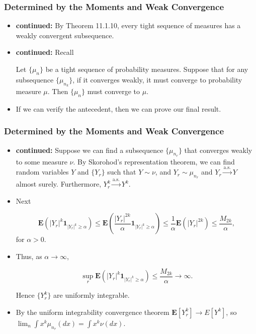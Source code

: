 \documentclass[handout]{beamer}
\newcommand{\BE}{\mathbf{E}}
\newcommand{\BI}{\mathbf{1}}
\begin{document}
\frame
{
  \frametitle{Determined by the Moments and Weak Convergence}

 \begin{itemize}

\item<2-> \textbf{continued:} By Theorem 11.1.10, every tight sequence of measures has a weakly convergent subsequence. 

\item<3-> \textbf{continued:} Recall \begin{Corollary}[11.1.11]
 Let $\{\mu_n\}$ be a tight sequence of probability measures. Suppose that for any subsequence $\{\mu_{n_k}\}$, if it converges weakly, it must converge to probability measure $\mu$. Then $\{\mu_n\}$ must converge to $\mu$.
 \end{Corollary}
 
 \item<4-> If we can verify the antecedent, then we can prove our final result.

\end{itemize}
 }




\frame
{
  \frametitle{Determined by the Moments and Weak Convergence}

 \begin{itemize}

\item<5-> \textbf{continued:} Suppose we can find a subsequence $\{\mu_{n_r}\}$ that converges weakly to some measure $\nu$. By Skorohod's representation theorem, we can find random variables $Y$ and $\{Y_r\}$ such that $Y\sim \nu$, and $Y_r\sim \mu_{n_r}$ and $Y_r \overset{\text{a.s.}}{\to} Y$ almost surely. Furthermore, $Y^k_r \overset{\text{a.s.}}{\to} Y^k$.

\item<6-> Next 

$$\BE(|Y_r|^k\BI_{|Y_r|^k\geq \alpha})\leq \BE \left(\frac{|Y_r|^{2k}}{\alpha}\BI_{|Y_r|^k\geq \alpha}\right)  \leq \frac{1}{\alpha} \BE(|Y_r|^{2k}) \leq\frac{M_{2k}}{\alpha},$$
for $\alpha>0$. 

\item<7-> Thus, as $\alpha\rightarrow \infty$,

$$\sup_r \BE(|Y_r|^k\BI_{|Y_r|^k\geq \alpha})\leq \frac{M_{2k}}{\alpha}\rightarrow \infty.$$

Hence $\{Y_r^k\}$ are uniformly integrable.

\item<8-> By the uniform integrability convergence theorem $\BE[Y_r^k] \to E[Y^k]$, so $\lim_n \int x^k \mu_{n_r}(dx)=\int x^k \nu(dx)$. 
\end{itemize}
 }
 
\end{document}

